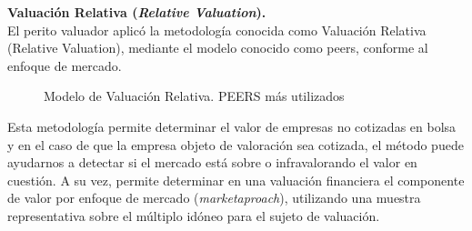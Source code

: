 \textcolor{secundario}{\textbf{Valuaci\'on Relativa (\textit{Relative Valuation}).}}\\[5pt]

El perito valuador aplic\'o la metodolog\'ia conocida como Valuaci\'on Relativa (Relative Valuation), mediante el modelo conocido como \gls{peers}, conforme al enfoque de mercado.\\




%
%
\begin{figure}[H]
\caption{Modelo de Valuaci\'on Relativa. PEERS m\'as utilizados\label{fig:peers1}}
       \hfill
\end{figure}

 Esta metodolog\'ia permite determinar el valor de empresas no cotizadas en bolsa y en el caso de que la empresa objeto de valoraci\'on sea cotizada, el m\'etodo puede ayudarnos a detectar si el mercado  est\'a sobre o infravalorando el valor en cuesti\'on.  A su vez, permite determinar en una valuaci\'on financiera el componente de valor por enfoque de mercado (\textit{\gls{marketaproach}}), utilizando una muestra representativa sobre el m\'ultiplo  id\'oneo para el sujeto de valuaci\'on. \\
 